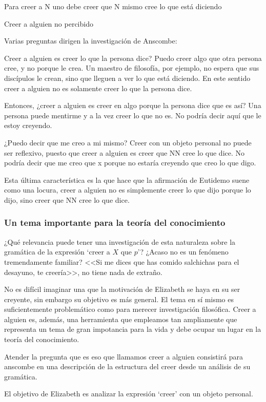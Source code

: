 Para creer a N uno debe creer que N mismo cree lo que está diciendo

Creer a alguien no percibido


Varias preguntas dirigen la investigación de Anscombe:

Creer a alguien es creer lo que la persona dice?
Puedo creer algo que otra persona cree, y no porque le crea. Un maestro de
filosofía, por ejemplo, no espera que sus discípulos le crean, sino que lleguen
a ver lo que está diciendo. En este sentido creer a alguien no es solamente
creer lo que la persona dice.

Entonces, ¿creer a alguien es creer en algo porque la persona dice que es así?
Una persona puede mentirme y a la vez creer lo que no es. No podría decir aquí
que le estoy creyendo.

¿Puedo decir que me creo a mi mismo? Creer con un objeto personal no puede ser
reflexivo, puesto que creer a alguien es creer que NN cree lo que dice. No
podría decir que me creo que x porque no estaría creyendo que creo lo que digo.

Esta última característica es la que hace que la afirmación de Eutidemo suene
como una locura, creer a alguien no es simplemente creer lo que dijo porque lo
dijo, sino creer que NN cree lo que dice.

\subsubsection{Un tema importante para la teoría del conocimiento}
¿Qué relevancia puede tener una investigación de esta naturaleza sobre la
gramática de la expresión `creer a $X$ que $p$'? ¿Acaso no es un fenómeno
tremendamente familiar? <<Si me dices que has comido salchichas para el
desayuno, te creería>>\autocite[1]{anscombe2008faith:tobelieve}, no tiene nada
de extraño.

No es difícil imaginar una que la motivación de Elizabeth se haya en su ser
creyente, sin embargo su objetivo es más general. El tema en sí mismo es
suficientemente problemático como para merecer investigación filosófica. Creer a
alguien es, además, una herramienta que empleamos tan ampliamente que representa
un tema de gran impotancia para la vida y debe ocupar un lugar en la teoría del
conocimiento.

Atender la pregunta que es eso que llamamos creer a alguien consistirá para
anscombe en una descripción de la estructura del creer desde un análisis de su
gramática.

El objetivo de Elizabeth es analizar la expresión `creer' con un objeto
personal.

